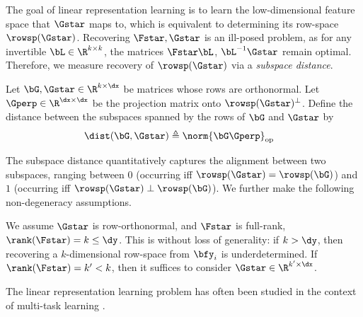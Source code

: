 The goal of linear representation learning is to learn the low-dimensional feature space that $\Gstar$ maps to, which is equivalent to determining its row-space $\rowsp(\Gstar)$. Recovering $\Fstar, \Gstar$ is an ill-posed problem, as for any invertible $\bL \in \R^{k \times k}$, the matrices $\Fstar \bL$, $\bL^{-1} \Gstar$ remain optimal. Therefore, we measure recovery of $\rowsp(\Gstar)$ via a \textit{subspace distance}.
\begin{definition}\label{def:subspace_dist}
    Let $\bG, \Gstar \in \R^{k \times \dx}$ be matrices whose rows are orthonormal.
    Let $\Gperp \in \R^{\dx \times \dx}$ be the projection matrix onto $\rowsp(\Gstar)^\perp$. Define the distance between the subspaces spanned by the rows of $\bG$ and $\Gstar$ by
    \begin{align}\label{eq: subspace distance}
        \dist(\bG, \Gstar) &\triangleq \norm{\bG \Gperp}_{\rm op}
    \end{align}
\end{definition}
The subspace distance quantitatively captures the alignment between two subspaces, ranging between $0$ (occurring iff $\rowsp(\Gstar) = \rowsp(\bG)$) and $1$ (occurring iff $\rowsp(\Gstar) \perp \rowsp(\bG)$).
We further make the following non-degeneracy assumptions.
\begin{assumption}\label{assump:full_rank_orth}
    We assume $\Gstar$ is row-orthonormal, and $\Fstar$ is full-rank, $\rank(\Fstar) = k \leq \dy$. This is without loss of generality: if $k > \dy$, then recovering a $k$-dimensional row-space from $\bfy_i$ is underdetermined. If $\rank(\Fstar) = k' < k$, then it suffices to consider $\Gstar \in \R^{k' \times \dx}$.
\end{assumption}
The linear representation learning problem has often been studied in the context of multi-task learning \citep{du2020few, tripuraneni2020theory, collins2021exploiting, thekumparampil2021sample, zhang2023meta}.

